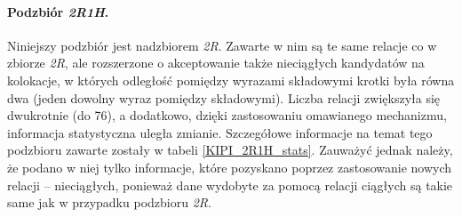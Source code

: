 \documentclass[11pt,a4paper]{llncs}
\begin{document}
\paragraph{Podzbiór \protect\textit{2R1H}.}
Niniejszy podzbiór jest nadzbiorem \emph{2R}.
Zawarte w nim są te same relacje co w zbiorze \emph{2R}, ale rozszerzone o akceptowanie także nieciągłych kandydatów na kolokacje, w których odległość pomiędzy wyrazami składowymi krotki była równa dwa (jeden dowolny wyraz pomiędzy składowymi).
Liczba relacji zwiększyła się dwukrotnie (do 76), a dodatkowo, dzięki zastosowaniu omawianego mechanizmu, informacja statystyczna uległa zmianie.
Szczegółowe informacje na temat tego podzbioru zawarte zostały w tabeli \ref{KIPI_2R1H_stats}.
Zauważyć jednak należy, że podano w niej tylko informacje, które pozyskano poprzez zastosowanie nowych relacji -- nieciągłych, ponieważ dane wydobyte za pomocą relacji ciągłych są takie same jak w przypadku podzbioru \emph{2R}.
\end{document}
